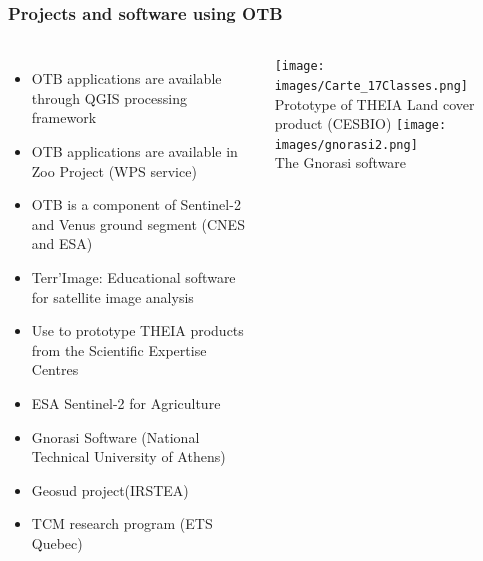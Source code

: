 \documentclass[8pt]{beamer}
\begin{document}
\begin{frame}
  \frametitle{Projects and software using OTB}
  \vspace{-0.5cm}
\begin{columns}
  \begin{itemize}
    \item OTB applications are available through QGIS processing framework
    \item OTB applications are available in Zoo Project (WPS service)
    \item OTB is a component of \alert{Sentinel-2} and Venus ground segment (CNES and ESA)
    \item Terr'Image: Educational software for satellite image analysis
    \item Use to prototype \alert{THEIA} products from the Scientific Expertise Centres
    \item ESA Sentinel-2 for Agriculture
    \item Gnorasi Software (National Technical University of Athens)
    \item Geosud project(IRSTEA)
    \item TCM research program (ETS Quebec)
  \end{itemize}
  \begin{center}
  \texttt{[image: images/Carte\_17Classes.png]}\\
  \tiny{Prototype of THEIA Land cover product (CESBIO)}
  \texttt{[image: images/gnorasi2.png]}\\
  \tiny{The Gnorasi software}
  \end{center}
\end{columns}
\end{frame}
\end{document}
